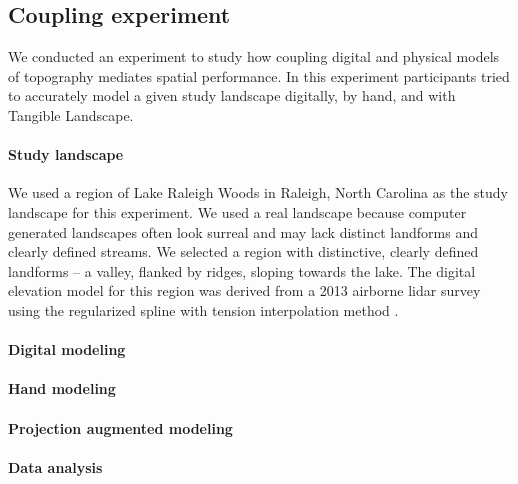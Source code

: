 \documentclass[prodmode,acmtochi]{acmsmall} %
\begin{document}


\subsection{Coupling experiment}
We conducted an experiment to study how coupling digital and physical models of topography mediates spatial performance. 
%
In this experiment %
participants tried to accurately model a given study landscape 
digitally, by hand, and with Tangible Landscape. 

\paragraph{Study landscape}
We used a region of Lake Raleigh Woods in Raleigh, North Carolina 
as the study landscape for this experiment. 
%
We used a real landscape because computer generated landscapes 
often look surreal and may lack distinct landforms and clearly defined streams. 
%
We selected a region with distinctive, 
clearly defined landforms -- a valley, flanked by ridges, sloping towards the lake.
%
The digital elevation model for this region was derived from a 2013 airborne lidar survey using the regularized spline with tension interpolation method \cite{Mitasova2005}. 


\paragraph{Digital modeling}





\paragraph{Hand modeling}


\paragraph{Projection augmented modeling}


\paragraph{Data analysis}
\end{document}
